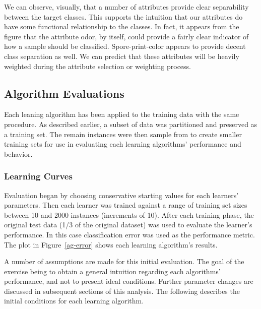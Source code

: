 \documentclass{sig-alternate}
\begin{document}
We can observe, visually, that a number of attributes provide clear separability between the target classes. This supports the intuition that our attributes do have some functional relationship to the classes. In fact, it appears from the figure that the attribute odor, by itself, could provide a fairly clear indicator of how a sample should be classified. Spore-print-color appears to provide decent class separation as well. We can predict that these attributes will be heavily weighted during the attribute selection or weighting process.

\subsection{Algorithm Evaluations}

Each leaning algorithm has been applied to the training data with the same procedure. As described earlier, a subset of data was partitioned and preserved as a training set. The remain instances were then sample from to create smaller training sets for use in evaluating each learning algorithms' performance and behavior.


\subsubsection{Learning Curves}

Evaluation began by choosing conservative starting values for each learners' parameters. Then each learner was trained against a range of training set sizes between 10 and 2000 instances (increments of 10). After each training phase, the original test data (1/3 of the original dataset) was used to evaluate the learner's performance. In this case classification error was used as the performance metric. The plot in Figure~\ref{ag-error} shows each learning algorithm's results.

A number of assumptions are made for this initial evaluation. The goal of the exercise being to obtain a general intuition regarding each algorithms' performance, and not to present ideal conditions. Further parameter changes are discussed in subsequent sections of this analysis. The following describes the initial conditions for each learning algorithm.
\end{document}
